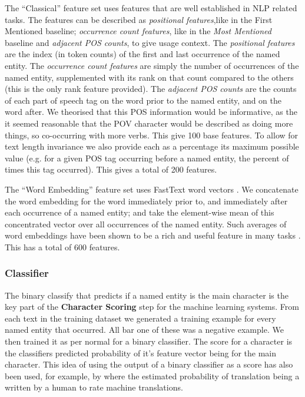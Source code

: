 \documentclass[11pt,a4paper]{article}
\newcommand{\parencite}{\citep}
\newcommand{\textcite}{\cite}
\begin{document}
The  ``Classical'' feature set uses features that are well established in NLP related tasks.
The features can be described as \emph{positional features},like in the First Mentioned baseline; \emph{occurrence count features}, like in the \emph{Most Mentioned} baseline
and \emph{adjacent POS counts}, to give usage context.
The \emph{positional features} are the index (in token counts) of the first and last occurrence of the named entity.
The \emph{occurrence count features} are simply the number of occurrences of the named entity, supplemented with its rank on that count compared to the others (this is the only rank feature provided).
The \emph{adjacent POS counts} are the counts of each part of speech tag on the word prior to the named entity, and on the word after.
We theorised that this POS information would be informative, as the it seemed reasonable that the POV character would be described as doing more things, so co-occurring with more verbs.
This give 100 base features.
To allow for text length invariance we also provide each as a percentage its maximum possible value (e.g. for a given POS tag occurring before a named entity, the percent of times this tag occurred).
This gives a total of 200 features.




The ``Word Embedding'' feature set uses FastText word vectors \parencite{bojanowski2016enriching}.
We concatenate the word embedding for the word immediately prior to, and immediately after each occurrence of a named entity;
and take the element-wise mean of this concentrated vector over all occurrences of the named entity.
Such averages of word embeddings have been shown to be a rich and useful feature in many tasks \parencite{White2015SentVecMeaning,mikolovSkip}.
This has a total of 600 features.

\subsubsection{Classifier}
The binary classify that predicts if a named entity is the main character is the key part of the \textbf{Character Scoring} step for the machine learning systems.
From each text in the training dataset
we generated a training example for every named entity that occurred.
All bar one of these was a negative example.
We then trained it as per normal for a binary classifier.
The score for a character is the classifiers predicted probability of it's feature vector being for the main character.
This idea of using the output of a binary classifier as a score has also been used, for example, by \textcite{corston2001machine} where the estimated probability of translation being a written by a human to rate machine translations.
\end{document}
